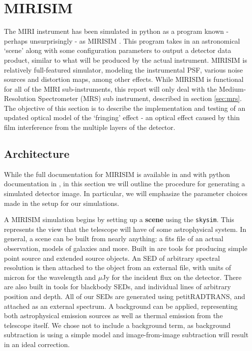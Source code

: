 \section{MIRISIM}

The MIRI instrument has been simulated in python as a program known - perhaps unsurprisingly - as MIRISIM \parencite{ref:mirisimdocs}. 
This program takes in an astronomical `scene' along with some configuration parameters to output a detector data product, similar to what will be produced by the actual instrument.
MIRISIM is relatively full-featured simulator, modeling the instrumental PSF, various noise sources and distortion maps, among other effects.
While MIRISIM is functional for all of the MIRI sub-instruments, this report will only deal with the Medium-Resolution Spectrometer (MRS) sub instrument, described in section \ref{sec:mrs}.
The objective of this section is to describe the implementation and testing of an updated optical model of the `fringing' effect - an optical effect caused by thin film interference from the multiple layers of the detector.
\subsection{Architecture}
While the full documentation for MIRISIM is available in \parencite{ref:mirisimdocs} and with python documentation in \parencite{Cossou2018}, in this section we will outline the procedure for generating a simulated detector image.
In particular, we will emphasize the parameter choices made in the setup for our simulations.

A MIRISIM simulation begins by setting up a \textbf{scene} using the \verb|skysim|. 
This represents the view that the telescope will have of some astrophysical system.
In general, a scene can be built from nearly anything: a fits file of an actual observation, models of galaxies and more. 
Built in are tools for producing simple point source and extended source objects.
An SED of arbitrary spectral resolution is then attached to the object from an external file, with units of micron for the wavelength and $\mu$Jy for the incident flux on the detector.
There are also built in tools for blackbody SEDs, and individual lines of arbitrary position and depth.
All of our SEDs are generated using petitRADTRANS, and attached as an external spectrum.
A background can be applied, representing both astrophysical emission sources as well as thermal emission from the telescope itself.
We chose not to include a background term, as background subtraction is using a simple model and image-from-image subtraction will result in an ideal correction.

